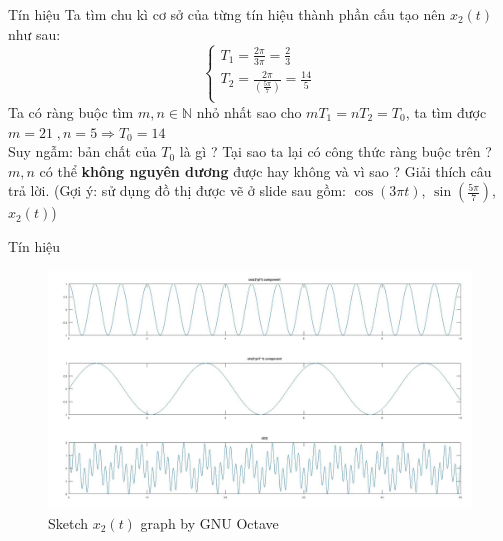 \documentclass[8pt]{beamer}
\begin{document}
\begin{frame}{Tín hiệu}
Ta tìm chu kì cơ sở của từng tín hiệu thành phần cấu tạo nên $x_{2}(t)$ như sau:
\begin{equation*}
	\begin{cases}
		T_{1}=\frac{2\pi}{3\pi}=\frac{2}{3} \\
		T_{2}=\frac{2\pi}{\left(\frac{5\pi}{7}\right)}=\frac{14}{5} \\
	\end{cases}
\end{equation*}
Ta có ràng buộc tìm $m, n\in\mathbb{N}$ nhỏ nhất sao cho $mT_{1}=nT_{2}=T_{0}$, ta tìm được $m=21\; ,n=5\Rightarrow T_{0}=14$
\\Suy ngẫm: bản chất của $T_{0}$ là gì ? Tại sao ta lại có công thức ràng buộc trên ? $m, n$ có thể \textbf{không nguyên dương} được hay không và vì sao ? Giải thích câu trả lời. (Gợi ý: sử dụng đồ thị được vẽ ở slide sau gồm: $\cos{(3\pi t)}$, $\sin{\left(\frac{5\pi}{7}\right)}$, $x_{2}(t)$)
\end{frame}
\begin{frame}{Tín hiệu}

\begin{figure}[h]
			\includegraphics[width=1\textwidth]{x2t.jpg}
			\caption{Sketch $x_{2}(t)$ graph by GNU Octave}			\label{fig:re6}
		\end{figure}
	\end{frame}
\end{document}
